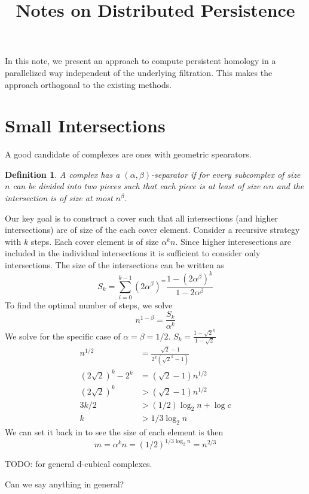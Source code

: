\documentclass{amsart}
\title{Notes on Distributed Persistence}
\newtheorem{definition}{Definition}[theorem]
\begin{document}
 
\maketitle

In this note, we present an approach to compute persistent homology in a parallelized way independent of the underlying filtration. This makes the approach orthogonal to the existing methods.



\section{Small Intersections}
A good candidate of complexes are ones with geometric spearators. 
\begin{definition}
A complex has a $(\alpha,\beta)$-separator if for every subcomplex of size $n$ can be divided into two pieces such that each piece is at least of size $\alpha n$ and the intersection is of size at most $n^\beta$. 
\end{definition}

Our key goal is to construct a cover such that all intersections (and higher intersections) are of size of the  each cover element. Consider a 
recursive strategy with $k$ steps. 
Each cover element is of size $\alpha^k n$. Since higher interesections are included in the individual intersections it is sufficient to consider only intersections.
The size of the intersections can be written as 
$$
S_k =\sum\limits_{i=0}^{k-1} (2\alpha^\beta)^ = \frac{1-(2\alpha^\beta)^k  }  {1-2\alpha^\beta}$$
To find the optimal number of steps, we solve
$$ n^{1-\beta} = \frac{S_k}{\alpha^k}$$
We solve for the specific case of $\alpha = \beta = 1/2$.
$S_k = \frac{1-\sqrt{2}^k}{1-\sqrt{2}}$
\begin{align*}
	n^{1/2} &=  \frac{\sqrt{2}-1}{2^k(\sqrt{2}^k-1)}\\
	(2\sqrt{2})^k - 2^k &= (\sqrt{2}-1) n^{1/2}\\
	(2\sqrt{2})^k  &> (\sqrt{2}-1) n^{1/2}\\
	3k/2 &> (1/2 ) \log_2 n + \log c  \\
	k &> 1/3 \log_2 n 
\end{align*}
We can set it back in to see the size of each element is then
$$m = \alpha^k n =   (1/2)^{1/3\log_2 n} = n^{2/3}$$


TODO: for general d-cubical complexes.


Can we say anything in general?
\end{document}
